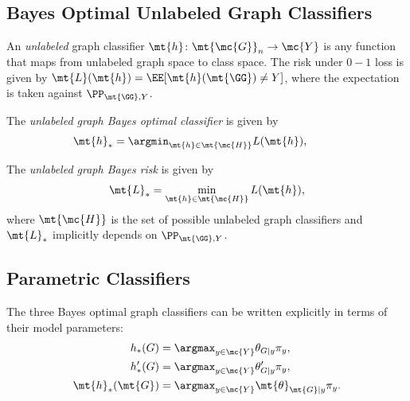 \documentclass[10pt,journal,cspaper,compsoc]{IEEEtran}
\begin{document}
\subsection{Bayes Optimal Unlabeled Graph Classifiers} %


An \emph{unlabeled} graph classifier $\mt{h}\colon \mt{\mc{G}}_n \to \mc{Y}$ is any function that maps from unlabeled graph space to class space. The risk under $0-1$ loss is given by $\mt{L}(\mt{h})=\EE[\mt{h}(\mt{\GG})\neq Y]$, where the expectation is taken against $\PP_{\mt{\GG},Y}$. 

The \emph{unlabeled graph Bayes optimal classifier} is given by %
\begin{align}
	\mt{h}_* &= \argmin_{\mt{h} \in \mt{\mc{H}}} L(\mt{h}), \qquad %
\end{align}



The \emph{unlabeled graph Bayes risk} is given by %
\begin{align}
	\mt{L}_* =\min_{\mt{h} \in \mt{\mc{H}}} L(\mt{h}),
\end{align}
where $\mt{\mc{H}}$ is the set of possible unlabeled graph classifiers
and $\mt{L}_*$ implicitly depends on $\PP_{\mt{\GG},Y}$.  


\subsection{Parametric Classifiers} %
\label{sub:parametric_classifiers}


The three Bayes optimal graph classifiers can be written explicitly in terms of their model parameters:
\begin{align}
	h_*(G) &= \argmax_{y \in \mc{Y}} \theta_{G|y}\pi_y, \label{eq:La_Bayes} \\
	h_*'(G) &= \argmax_{y \in \mc{Y}} \theta_{G|y}' \pi_y,  \label{eq:Sh_Bayes} \\
	\mt{h}_*(\mt{G}) &= \argmax_{y \in \mc{Y}}  \mt{\theta}_{\mt{G}|y}\pi_y. \label{eq:Un_Bayes}
\end{align}
\end{document}
